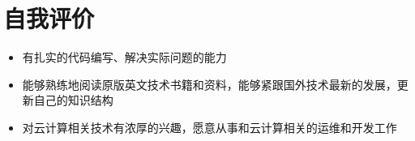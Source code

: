 \documentclass{resume}
\begin{document}



\section{自我评价}
\begin{itemize}
  \item 有扎实的代码编写、解决实际问题的能力
  \item 能够熟练地阅读原版英文技术书籍和资料，能够紧跟国外技术最新的发展，更新自己的知识结构
  \item 对云计算相关技术有浓厚的兴趣，愿意从事和云计算相关的运维和开发工作
\end{itemize}
\end{document}
